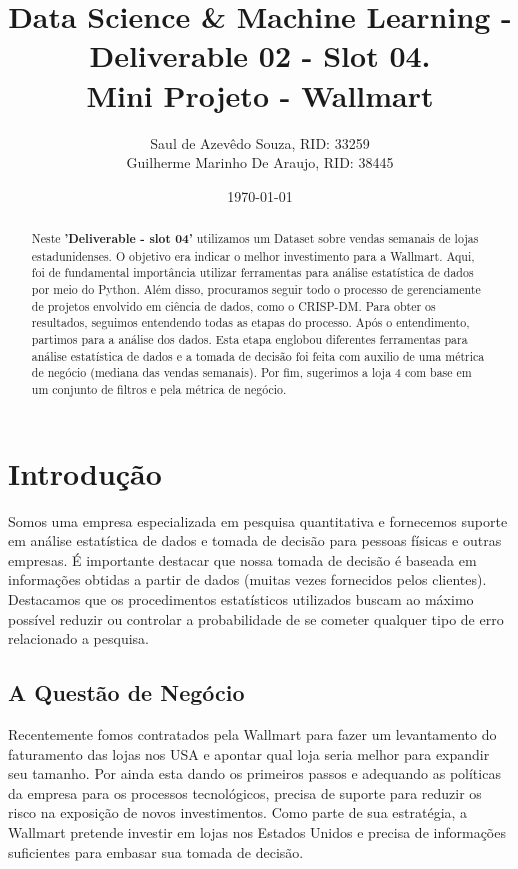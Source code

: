 \documentclass[letterpaper,11pt]{article}
\begin{document}
\title{Data Science \& Machine Learning - Deliverable 02 - Slot 04. \\\textbf{Mini Projeto - Wallmart}}
\author{Saul de Azevêdo Souza, RID: 33259\\
 Guilherme Marinho De Araujo, RID: 38445}
\date{\today}
\maketitle

\begin{abstract}
Neste \textbf{'Deliverable - slot 04'} utilizamos um Dataset sobre vendas semanais de lojas estadunidenses. O objetivo era indicar o melhor investimento para a Wallmart. Aqui, foi de fundamental importância utilizar ferramentas para análise estatística de dados por meio do Python. Além disso, procuramos seguir todo o processo de gerenciamente de projetos envolvido em ciência de dados, como o CRISP-DM. Para obter os resultados, seguimos entendendo todas as etapas do processo. Após o entendimento, partimos para a análise dos dados. Esta etapa englobou diferentes ferramentas para análise estatística de dados e a tomada de decisão foi feita com auxilio de uma métrica de negócio (mediana das vendas semanais). Por fim, sugerimos a loja 4 com base em um conjunto de filtros e pela métrica de negócio.

\end{abstract}

\section{Introdução}%
Somos uma empresa especializada em pesquisa quantitativa e fornecemos suporte em análise estatística de dados e tomada de decisão para pessoas físicas e outras empresas. É importante destacar que nossa tomada de decisão é baseada em informações obtidas a partir de dados (muitas vezes fornecidos pelos clientes). Destacamos que os procedimentos estatísticos utilizados buscam ao máximo possível reduzir ou controlar a probabilidade  de se cometer qualquer tipo de erro relacionado a pesquisa.

\subsection{A Questão de Negócio}

Recentemente fomos contratados pela Wallmart para fazer um levantamento do faturamento das lojas nos USA e apontar qual loja seria melhor para expandir seu tamanho. Por ainda esta dando os primeiros passos e adequando as políticas da empresa para os processos tecnológicos, precisa de suporte para reduzir os risco na exposição de novos investimentos. Como parte de sua estratégia, a Wallmart pretende investir em lojas nos Estados Unidos e precisa de informações suficientes para embasar sua tomada de decisão.
\end{document}

